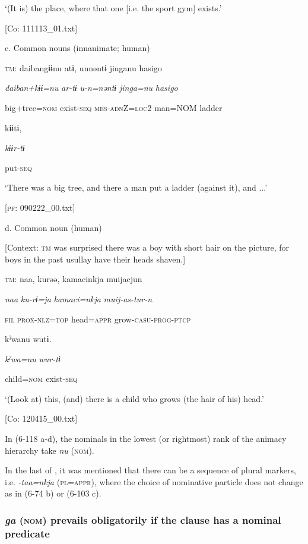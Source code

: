       ‘(It is) the place, where that one [i.e. the sport gym] exists.’

      [Co: 111113\_01.txt]

  c.  Common nouns (innanimate; human)

    \textsc{tm}:  daibangɨɨnu  atɨ,  unnəntɨ  jinganu  {\textbar}hasigo{\textbar}

      \textit{daiban+kɨɨ=nu}  \textit{ar-tɨ}  \textit{u-n=nəntɨ}  \textit{jinga=nu}  \textit{hasigo}

      big+tree=\textsc{nom}  exist-\textsc{seq}  \textsc{mes}-\textsc{adn}Z=\textsc{loc}2  man=NOM  ladder

      kɨɨtɨ,

      \textit{kɨɨr-tɨ}

      put-\textsc{seq}

      ‘There was a big tree, and there a man put a ladder (against it), and ...’

      [\textsc{pf}: 090222\_00.txt]

  d.  Common noun (human)

    [Context: \textsc{tm} was surprised there was a boy with short hair on the picture, for boys in the past usullay have their heads shaven.]

    \textsc{tm}:  naa,  kurəə,  kamacinkja  muijacjun

      \textit{naa}  \textit{ku-rɨ=ja}  \textit{kamaci=nkja}  \textit{muij-as-tur-n}

      \textsc{fil}  \textsc{prox}-\textsc{nlz}=\textsc{top}  head=\textsc{appr}  grow-\textsc{casu}-\textsc{prog}-\textsc{ptcp}

      kˀwanu  wutɨ.

      \textit{kˀwa=nu}  \textit{wur-tɨ}

      child=\textsc{nom}  exist-\textsc{seq}

      ‘(Look at) this, (and) there is a child who grows (the hair of his) head.’

      [Co: 120415\_00.txt]

In (6-118 a-d), the nominals in the lowest (or rightmost) rank of the animacy hierarchy take \textit{nu} (\textsc{nom}).

  In the last of , it was mentioned that there can be a sequence of plural markers, i.e. \textit{{}-taa=nkja} (\textsc{pl}=\textsc{appr}), where the choice of nominative particle does not change as in (6-74 b) or (6-103 c).

\subsubsection{\textit{ga} (\textsc{nom}) prevails obligatorily if the clause has a nominal predicate}

